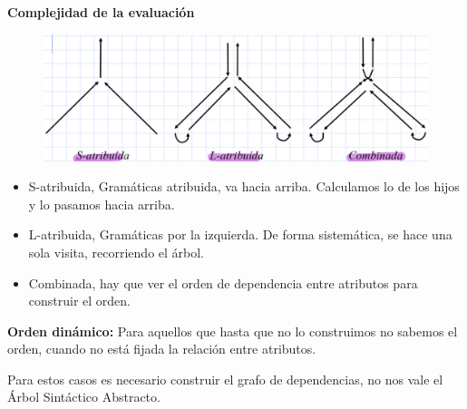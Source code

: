 \documentclass[12pt]{report} %
\begin{document}
\textbf{Complejidad de la evaluación}
\begin{figure}[H]
  {\includegraphics[scale=.25]{2021-05-01 01_46_28-05_resum_Sem_2021.pdf - Foxit Reader.png}}
\end{figure}
\begin{itemize}
  \item S-atribuida, Gramáticas atribuida, va hacia arriba. Calculamos lo de los hijos y lo pasamos hacia arriba.
  \item L-atribuida, Gramáticas por la izquierda. De forma sistemática, se hace una sola visita, recorriendo el árbol.
  \item Combinada, hay que ver el orden de dependencia entre atributos para construir el orden.
\end{itemize}

\textbf{Orden dinámico:} Para aquellos que hasta que no lo construimos no sabemos el orden, cuando no está fijada la relación entre atributos.
  
Para estos casos es necesario construir el grafo de dependencias, no nos vale el Árbol Sintáctico Abstracto.
\end{document}
